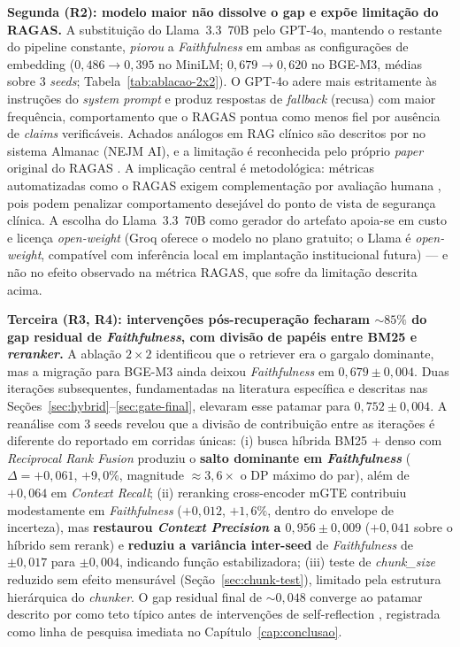 \documentclass[
  12pt,
  oneside,
  a4paper,
  english,
  brazil
]{abntex2}
\begin{document}
\textbf{Segunda (R2): modelo maior não dissolve o gap e expõe limitação
do RAGAS.} A substituição do Llama~3.3~70B pelo GPT-4o, mantendo o restante
do pipeline constante, \emph{piorou} a \textit{Faithfulness} em ambas
as configurações de embedding ($0{,}486 \to 0{,}395$ no MiniLM;
$0{,}679 \to 0{,}620$ no BGE-M3, médias sobre 3 \emph{seeds};
Tabela~\ref{tab:ablacao-2x2}). O GPT-4o adere mais estritamente às
instruções do \textit{system prompt} e produz respostas de
\textit{fallback} (recusa) com maior frequência, comportamento que o
RAGAS pontua como menos fiel por ausência de \emph{claims} verificáveis.
Achados análogos em RAG clínico são descritos por
\citeauthor{zakka2024almanac} \cite{zakka2024almanac} no sistema
Almanac (NEJM AI), e a limitação é reconhecida pelo próprio
\emph{paper} original do RAGAS \cite{es2024}. A implicação central é
metodológica: métricas automatizadas como o RAGAS exigem complementação
por avaliação humana \cite{ocaf2024, gallifant2025tripod}, pois podem
penalizar comportamento desejável do ponto de vista de segurança
clínica. A escolha do Llama~3.3~70B como gerador do artefato apoia-se
em custo e licença \emph{open-weight} (Groq oferece o modelo no plano
gratuito; o Llama é \emph{open-weight}, compatível com inferência
local em implantação institucional futura) --- e não no efeito
observado na métrica RAGAS, que sofre da limitação descrita acima.

\textbf{Terceira (R3, R4): intervenções pós-recuperação fecharam
$\sim 85\%$ do gap residual de \textit{Faithfulness}, com divisão de
papéis entre BM25 e \emph{reranker}.} A ablação $2 \times 2$ identificou que o
retriever era o gargalo dominante, mas a migração para BGE-M3 ainda
deixou \textit{Faithfulness} em $0{,}679 \pm 0{,}004$. Duas iterações
subsequentes, fundamentadas na literatura específica e descritas nas
Seções~\ref{sec:hybrid}--\ref{sec:gate-final}, elevaram esse patamar para
$0{,}752 \pm 0{,}004$. A reanálise com 3 seeds revelou que a divisão de
contribuição entre as iterações é diferente do reportado em corridas únicas:
(i) busca híbrida BM25 + denso com \textit{Reciprocal Rank Fusion}
\cite{cormack2009, formal2021, khattab2020} produziu o \textbf{salto dominante
em \textit{Faithfulness}} ($\Delta = +0{,}061$, $+9{,}0\%$, magnitude
$\approx 3{,}6\times$ o DP máximo do par), além de $+0{,}064$ em
\textit{Context Recall};
(ii) reranking cross-encoder mGTE
\cite{zhang2024mgte, wang2024bestpractices} contribuiu modestamente em
\textit{Faithfulness} ($+0{,}012$, $+1{,}6\%$, dentro do envelope de
incerteza), mas \textbf{restaurou \textit{Context Precision} a $0{,}956
\pm 0{,}009$} ($+0{,}041$ sobre o híbrido sem rerank) e
\textbf{reduziu a variância inter-seed} de \textit{Faithfulness} de
$\pm 0{,}017$ para $\pm 0{,}004$, indicando função estabilizadora; (iii) teste
de \textit{chunk\_size} reduzido sem efeito mensurável
(Seção~\ref{sec:chunk-test}), limitado pela estrutura hierárquica do
\textit{chunker}. O gap residual final de $\sim 0{,}048$ converge ao patamar
descrito por \citeauthor{ocaf2024} \cite{ocaf2024} como teto típico antes de
intervenções de self-reflection \cite{jeong2024selfbiorag}, registrada
como linha de pesquisa imediata no Capítulo~\ref{cap:conclusao}.
\end{document}
